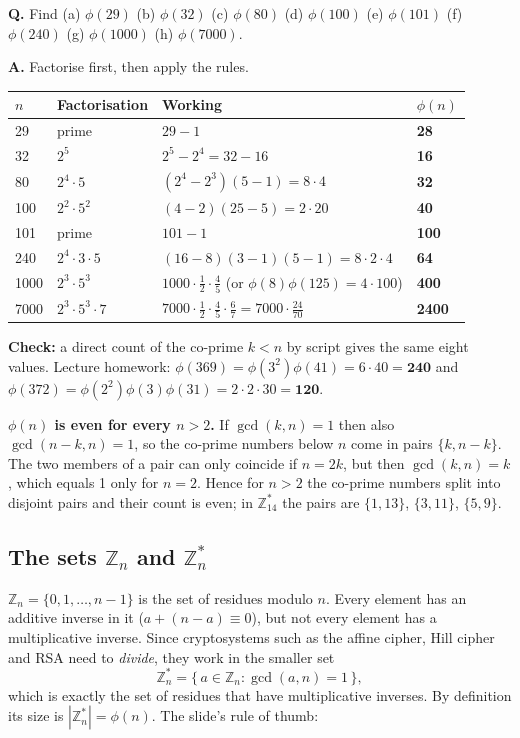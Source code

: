\begin{worked}
\textbf{Q.} Find (a) $\phi(29)$ (b) $\phi(32)$ (c) $\phi(80)$ (d) $\phi(100)$ (e) $\phi(101)$ (f) $\phi(240)$ (g) $\phi(1000)$ (h) $\phi(7000)$.

\textbf{A.} Factorise first, then apply the rules.
\begin{center}\small
\begin{tabular}{@{}llll@{}}
\toprule
$n$ & Factorisation & Working & $\phi(n)$\\
\midrule
29 & prime & $29 - 1$ & \textbf{28}\\
32 & $2^5$ & $2^5 - 2^4 = 32 - 16$ & \textbf{16}\\
80 & $2^4 \cdot 5$ & $(2^4 - 2^3)(5 - 1) = 8 \cdot 4$ & \textbf{32}\\
100 & $2^2 \cdot 5^2$ & $(4 - 2)(25 - 5) = 2 \cdot 20$ & \textbf{40}\\
101 & prime & $101 - 1$ & \textbf{100}\\
240 & $2^4 \cdot 3 \cdot 5$ & $(16 - 8)(3 - 1)(5 - 1) = 8 \cdot 2 \cdot 4$ & \textbf{64}\\
1000 & $2^3 \cdot 5^3$ & $1000 \cdot \frac12 \cdot \frac45$ \;(or $\phi(8)\phi(125) = 4 \cdot 100$) & \textbf{400}\\
7000 & $2^3 \cdot 5^3 \cdot 7$ & $7000 \cdot \frac12 \cdot \frac45 \cdot \frac67 = 7000 \cdot \frac{24}{70}$ & \textbf{2400}\\
\bottomrule
\end{tabular}
\end{center}
\textbf{Check:} a direct count of the co-prime $k < n$ by script gives the same eight values. Lecture homework: $\phi(369) = \phi(3^2)\phi(41) = 6 \cdot 40 = \mathbf{240}$ and $\phi(372) = \phi(2^2)\phi(3)\phi(31) = 2 \cdot 2 \cdot 30 = \mathbf{120}$.
\end{worked}

\textbf{$\phi(n)$ is even for every $n > 2$.} If $\gcd(k, n) = 1$ then also $\gcd(n - k, n) = 1$, so the co-prime numbers below $n$ come in pairs $\{k, n-k\}$. The two members of a pair can only coincide if $n = 2k$, but then $\gcd(k, n) = k$, which equals 1 only for $n = 2$. Hence for $n > 2$ the co-prime numbers split into disjoint pairs and their count is even; in $\mathbb{Z}_{14}^*$ the pairs are $\{1, 13\}$, $\{3, 11\}$, $\{5, 9\}$.

\subsection{The sets $\mathbb{Z}_n$ and $\mathbb{Z}_n^*$}
$\mathbb{Z}_n = \{0, 1, \dots, n-1\}$ is the set of residues modulo $n$. Every element has an additive inverse in it ($a + (n - a) \equiv 0$), but not every element has a multiplicative inverse. Since cryptosystems such as the affine cipher, Hill cipher and RSA need to \emph{divide}, they work in the smaller set
\[
\mathbb{Z}_n^* = \{\, a \in \mathbb{Z}_n : \gcd(a, n) = 1 \,\},
\]
which is exactly the set of residues that have multiplicative inverses. By definition its size is $|\mathbb{Z}_n^*| = \phi(n)$. The slide's rule of thumb: 

